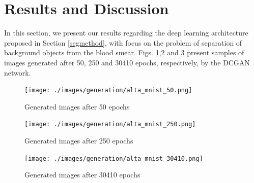 \section{Results and Discussion}
\label{results}


In this section, we present our results regarding the deep learning architecture proposed in Section \ref{segmethod}, with focus on the problem of separation of background objects from the blood smear. Figs. \ref{fig:gen50},\ref{fig:gen250} and \ref{fig:gen30410} present samples of images generated after 50, 250 and 30410 epochs, respectively, by the DCGAN network.  

\begin{figure}[h]
\caption{Generated images after 50 epochs}
\label{fig:gen50}
\begin{center}
\texttt{[image: ./images/generation/alta\_mnist\_50.png]} \end{center}
\end{figure}

\begin{figure}[h]
\caption{Generated images after 250 epochs}
\label{fig:gen250}
\begin{center}
\texttt{[image: ./images/generation/alta\_mnist\_250.png]} \end{center}
\end{figure}

\begin{figure}[h]
\caption{Generated images after 30410 epochs}
\label{fig:gen30410}
\begin{center}
\texttt{[image: ./images/generation/alta\_mnist\_30410.png]} \end{center}
\end{figure}


